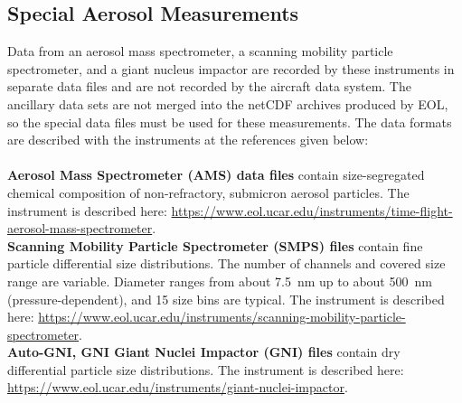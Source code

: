 \subsection{Special Aerosol Measurements}
\begin{hangparagraphs}
Data from an aerosol mass spectrometer,
a scanning mobility particle spectrometer, and a giant
nucleus impactor are recorded by these
instruments in separate data files and are not recorded by the aircraft
data system. The ancillary data
sets are not merged into the netCDF archives produced by EOL, so the
special data files must be used for these measurements. The data formats
are described with the instruments at the references given below:\\
\\
\textbf{Aerosol Mass Spectrometer (AMS) data files} contain size-segregated
chemical composition of non-refractory, submicron aerosol particles.
The instrument is described here: \href{https://www.eol.ucar.edu/instruments/time-flight-aerosol-mass-spectrometer}{https://www.eol.ucar.edu/instruments/time-flight-aerosol-mass-spectrometer}.\\
\textbf{Scanning Mobility Particle Spectrometer (SMPS) files} contain
fine particle differential size distributions. The number of channels
and covered size range are variable. Diameter ranges from about 7.5~nm
up to about 500~nm (pressure-dependent), and 15 size bins are typical.
The instrument is described here: \href{https://www.eol.ucar.edu/instruments/scanning-mobility-particle-spectrometer}{https://www.eol.ucar.edu/instruments/scanning-mobility-particle-spectrometer}.\\
\textbf{Auto-GNI, GNI Giant Nuclei Impactor (GNI) files} contain dry
differential particle size distributions. The instrument is described
here: \href{https://www.eol.ucar.edu/instruments/giant-nuclei-impactor}{https://www.eol.ucar.edu/instruments/giant-nuclei-impactor}.
\end{hangparagraphs}


